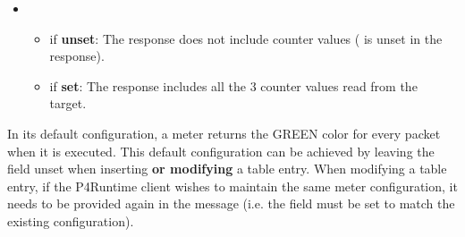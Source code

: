 \documentclass[11pt]{article}
\begin{document}
{\begin{itemize}
\begin{itemize}[noitemsep,topsep=\mdcompacttopsep]
\begin{itemize}[noitemsep,topsep=\mdcompacttopsep]
\item{}if \textbf{unset}: All the 3 counter entries are unchanged.%

\item{}if \textbf{set}: All the 3 counters are reset to 0. Sub-field, if any, can
only have zero (0) as its value.  error is returned
for any non-zero sub-field value.%
\end{itemize}%

\item{}

\begin{itemize}[noitemsep,topsep=\mdcompacttopsep]%

\item{}if \textbf{unset}: The response does not include counter values
( is unset in the response).%

\item{}if \textbf{set}: The response includes all the 3 counter values read from
the target.%
\end{itemize}%
\end{itemize}%
\end{itemize}%

\noindent{}In its default configuration, a meter returns the GREEN color for every packet
when it is executed. This default configuration can be achieved by leaving the
 field unset when inserting \textbf{or modifying} a table entry. When
modifying a table entry, if the P4Runtime client wishes to maintain the same
meter configuration, it needs to be provided again in the  message
(i.e. the  field must be set to match the existing configuration).%

}
\end{document}
